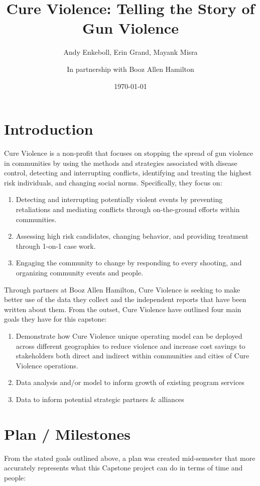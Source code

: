 \documentclass[11pt,preprint]{aastex}
\begin{document}
\title{Cure Violence: Telling the Story of Gun Violence}

 \author{Andy Enkeboll, Erin Grand, Mayank Misra}
 \author{In partnership with Booz Allen Hamilton}
 
\date{\today}             

\tableofcontents

\section{Introduction}
Cure Violence is a non-profit that focuses on stopping the spread of  gun violence in communities by using the methods and strategies associated with disease control, detecting and interrupting conflicts, identifying and treating the highest risk individuals, and changing social norms. Specifically, they focus on:
\begin{enumerate}
\item Detecting and interrupting potentially violent events by preventing retaliations and mediating conflicts through on-the-ground efforts within communities.
\item Assessing high risk candidates, changing behavior, and providing treatment through 1-on-1 case work.
\item Engaging the community to change by responding to every shooting, and organizing community events and people.
\end{enumerate}

Through partners at Booz Allen Hamilton, Cure Violence is seeking to make better use of the data they collect and the independent reports that have been written about them.  From the outset, Cure Violence have outlined four main goals they have for this capstone:
\begin{enumerate}
    \item Demonstrate how Cure Violence unique operating model can be deployed across different geographies to reduce violence and increase cost savings to stakeholders both direct and indirect within communities and cities of Cure Violence operations.
    \item Data analysis and/or model to inform growth of existing program services
    \item Data to inform potential strategic partners \& alliances
\end{enumerate}


\section{Plan / Milestones}
From the stated goals outlined above, a plan was created mid-semester that more accurately represents what this Capstone project can do in terms of time and people:
\end{document}
